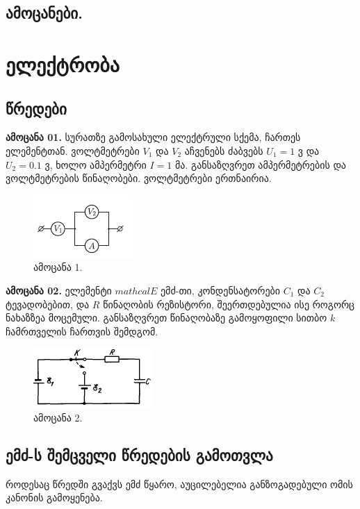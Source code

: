 \documentclass{book}
\begin{document}
\section{ამოცანები.}

\chapter{ელექტრობა}

\section{წრედები}
\textbf{ამოცანა 01.} სურათზე გამოსახული ელექტრული სქემა, ჩართეს ელემენტთან. ვოლტმეტრები $V_1$ და $V_2$ აჩვენებს ძაბვებს $U_1 = 1$ ვ და $U_2 = 0.1$ ვ, ხოლო ამპერმეტრი $I = 1$ მა. განსაზღვრეთ ამპერმეტრების და ვოლტმეტრების წინაღობები. ვოლტმეტრები ერთნაირია.
	\begin{figure}[H]
		\centering
		\includegraphics[width=0.3\columnwidth]{figures/phys852}
		\caption{ამოცანა 1.}
		\label{fig:phys852}
	\end{figure}
\textbf{ამოცანა 02.} ელემენტი $mathcal{E}$ ემძ-თი, კონდენსატორები $C_1$ და $C_2$ ტევადობებით, და $R$ წინაღობის რეზისტორი, შეერთდებულია ისე როგორც ნახაზზეა მოცემული. განსაზღვრეთ წინაღობაზე გამოყოფილი სითბო $k$ ჩამრთველის ჩართვის შემდგომ.
	\begin{figure}[H]
		\centering
		\includegraphics[width=0.3\columnwidth]{figures/phys694}
		\caption{ამოცანა 2.}
		\label{fig:phys694}
	\end{figure}

\section{ემძ-ს შემცველი წრედების გამოთვლა}
როდესაც წრედში გვაქვს ემძ წყარო, აუცილებელია განზოგადებული ომის კანონის გამოყენება. 
\end{document}
